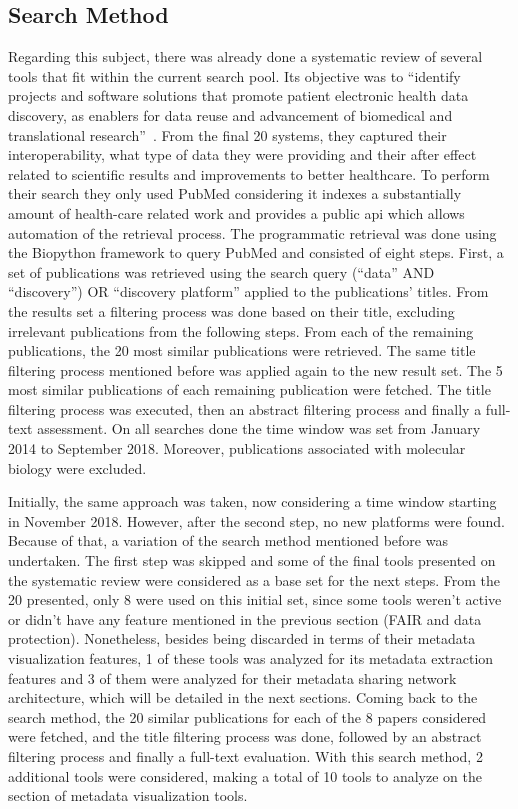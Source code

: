 \subsection*{Search Method}

Regarding this subject, there was already done a systematic review of several tools that fit within the current search pool.
Its objective was to ``identify projects and software solutions that promote patient electronic health data discovery, as enablers for data reuse and advancement of biomedical and translational research''~\cite{systematic_review}.
From the final 20 systems, they captured their interoperability, what type of data they were providing and their after effect related to scientific results and improvements to better healthcare.
To perform their search they only used PubMed  considering it indexes a substantially amount of health-care related work and provides a public \gls{api} which allows automation of the retrieval process.
The programmatic retrieval was done using the Biopython framework to query PubMed and consisted of eight steps.
First, a set of publications was retrieved using the search query (``data'' AND ``discovery'') OR ``discovery platform'' applied to the publications' titles.
From the results set a filtering process was done based on their title, excluding irrelevant publications from the following steps.
From each of the remaining publications, the 20 most similar publications were retrieved.
The same title filtering process mentioned before was applied again to the new result set.
The 5 most similar publications of each remaining publication were fetched.
The title filtering process was executed, then an abstract filtering process and finally a full-text assessment.
On all searches done the time window was set from January 2014 to September 2018.
Moreover, publications associated with molecular biology were excluded.

Initially, the same approach was taken, now considering a time window starting in November 2018.
However, after the second step, no new platforms were found.
Because of that, a variation of the search method mentioned before was undertaken.
The first step was skipped and some of the final tools presented on the systematic review were considered as a base set for the next steps.
From the 20 presented, only 8 were used on this initial set, since some tools weren't active or didn't have any feature mentioned in the previous section (FAIR and data protection).
Nonetheless, besides being discarded in terms of their metadata visualization features, 1 of these tools was analyzed for its metadata extraction features and 3 of them were analyzed for their metadata sharing network architecture, which will be detailed in the next sections.
Coming back to the search method, the 20 similar publications for each of the 8 papers considered were fetched, and the title filtering process was done, followed by an abstract filtering process and finally a full-text evaluation.
With this search method, 2 additional tools were considered, making a total of 10 tools to analyze on the section of metadata visualization tools.

